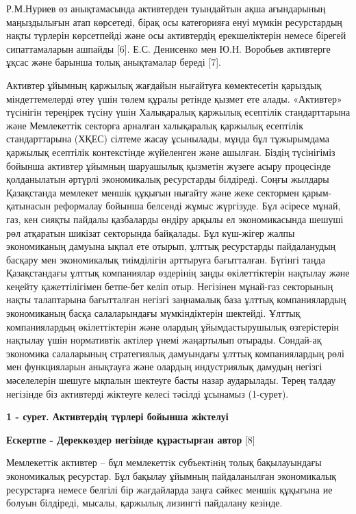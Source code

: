 {Р.М.Нуриев өз анықтамасында активтерден туындайтын ақша ағындарының
маңыздылығын атап көрсетеді, бірақ осы категорияға енуі мүмкін
ресурстардың нақты түрлерін көрсетпейді және осы активтердің
ерекшеліктерін немесе бірегей сипаттамаларын ашпайды {[}6{]}. Е.С.
Денисенко мен Ю.Н. Воробьев активтерге ұқсас және барынша толық
анықтамалар береді {[}7{]}.

Активтер ұйымның қаржылық жағдайын нығайтуға көмектесетін қарыздық
міндеттемелерді өтеу үшін төлем құралы ретінде қызмет ете алады.
«Активтер» түсінігін тереңірек түсіну үшін Халықаралық қаржылық
есептілік стандарттарына және Мемлекеттік секторға арналған халықаралық
қаржылық есептілік стандарттарына (ХҚЕС) сілтеме жасау ұсынылады, мұнда
бұл тұжырымдама қаржылық есептілік контекстінде жүйеленген және ашылған.
Біздің түсінігіміз бойынша активтер ұйымның шаруашылық қызметін жүзеге
асыру процесінде қолданылатын әртүрлі экономикалық ресурстарды
білдіреді. Соңғы жылдары Қазақстанда мемлекет меншік құқығын нығайту
және жеке сектормен қарым-қатынасын реформалау бойынша белсенді жұмыс
жүргізуде. Бұл әсіресе мұнай, газ, кен сияқты пайдалы қазбаларды өндіру
арқылы ел экономикасында шешуші рөл атқаратын шикізат секторында
байқалады. Бұл күш-жігер жалпы экономиканың дамуына ықпал ете отырып,
ұлттық ресурстарды пайдаланудың басқару мен экономикалық тиімділігін
арттыруға бағытталған. Бүгінгі таңда Қазақстандағы ұлттық компаниялар
өздерінің заңды өкілеттіктерін нақтылау және кеңейту қажеттілігімен
бетпе-бет келіп отыр. Негізінен мұнай-газ секторының нақты талаптарына
бағытталған негізгі заңнамалық база ұлттық компаниялардың экономиканың
басқа салаларындағы мүмкіндіктерін шектейді. Ұлттық компаниялардың
өкілеттіктерін және олардың ұйымдастырушылық өзгерістерін нақтылау үшін
нормативтік актілер үнемі жаңартылып отырады. Сондай-ақ экономика
салаларының стратегиялық дамуындағы ұлттық компаниялардың рөлі мен
функцияларын анықтауға және олардың индустриялық дамудың негізгі
мәселелерін шешуге ықпалын шектеуге басты назар аударылады. Терең талдау
негізінде біз активтерді жіктеуге келесі тәсілді ұсынамыз (1-сурет).

{\bfseries 1 - сурет. Активтердің түрлері бойынша жіктелуі}

{\bfseries Ескертпе - Дереккөздер негізінде құрастырған автор} {[}8{]}

Мемлекеттiк активтер -- бұл мемлекеттiк субъектiнiң толық бақылауындағы
экономикалық ресурстар. Бұл бақылау ұйымның пайдаланылған экономикалық
ресурстарға немесе белгілі бір жағдайларда заңға сәйкес меншік құқығына
ие болуын білдіреді, мысалы, қаржылық лизингті пайдалану кезінде.

}

